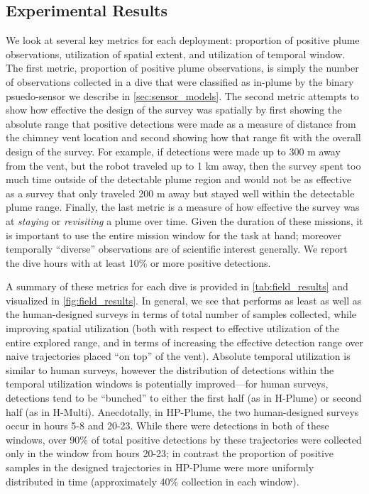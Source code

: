 \subsection{Experimental Results}
We look at several key metrics for each deployment: proportion of positive plume observations, utilization of spatial extent, and utilization of temporal window. The first metric, proportion of positive plume observations, is simply the number of observations collected in a dive that were classified as in-plume by the binary psuedo-sensor we describe in \cref{sec:sensor_models}. The second metric attempts to show how effective the design of the survey was spatially by first showing the absolute range that positive detections were made as a measure of distance from the chimney vent location and second showing how that range fit with the overall design of the survey. For example, if detections were made up to 300 m away from the vent, but the robot traveled up to 1 km away, then the survey spent too much time outside of the detectable plume region and would not be as effective as a survey that only traveled 200 m away but stayed well within the detectable plume range. Finally, the last metric is a measure of how effective the survey was at \emph{staying} or \emph{revisiting} a plume over time. Given the duration of these missions, it is important to use the entire mission window for the task at hand; moreover temporally ``diverse'' observations are of scientific interest generally. We report the dive hours with at least 10\% or more positive detections.

A summary of these metrics for each dive is provided in \cref{tab:field_results} and visualized in \cref{fig:field_results}. In general, we see that \PHORTEX performs as least as well as the human-designed surveys in terms of total number of samples collected, while improving spatial utilization (both with respect to effective utilization of the entire explored range, and in terms of increasing the effective detection range over naive trajectories placed ``on top'' of the vent). Absolute temporal utilization is similar to human surveys, however the distribution of detections within the temporal utilization windows is potentially improved---for human surveys, detections tend to be ``bunched'' to either the first half (as in H-Plume) or second half (as in H-Multi). Anecdotally, in HP-Plume, the two human-designed surveys occur in hours 5-8 and 20-23. While there were detections in both of these windows, over 90\% of total positive detections by these trajectories were collected only in the window from hours 20-23; in contrast the proportion of positive samples in the \PHORTEX designed trajectories in HP-Plume were more uniformly distributed in time (approximately 40\% collection in each window). 

